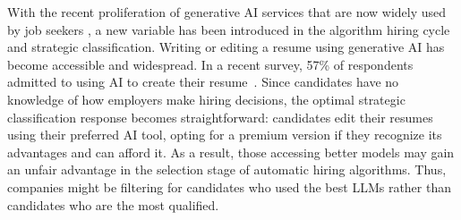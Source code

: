 With the recent proliferation of generative AI services that are now widely used by job seekers \citep{Chamorro_2024}, a new variable has been introduced in the algorithm hiring cycle and strategic classification. Writing or editing a resume using generative AI has become accessible and widespread.
In a recent survey, 57\% of respondents admitted to using AI to create their resume~\citep{Canva_2025}. 
Since candidates have no knowledge of 
how employers make hiring decisions, %
the optimal strategic classification response becomes straightforward: candidates edit their resumes using their preferred AI tool, opting for a premium version if they recognize its advantages and can afford it. As a result, those accessing better models may gain an unfair advantage in the selection stage of automatic hiring algorithms. Thus, companies might be filtering for candidates who used the best LLMs rather than candidates who are the most qualified. 


